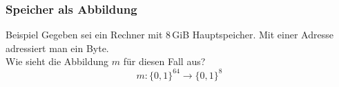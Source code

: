 \begin{frame}
	\frametitle{Speicher als Abbildung}
	\begin{exampleblock}{Beispiel}
		Gegeben sei ein Rechner mit 8\,GiB Hauptspeicher. Mit einer Adresse adressiert man ein Byte.\\
		Wie sieht die Abbildung $m$ für diesen Fall aus?
		\pause
		\begin{equation*}
			m:\{0,1\}^{64}\rightarrow \{0,1\}^8
		\end{equation*}
	\end{exampleblock}
\end{frame}



